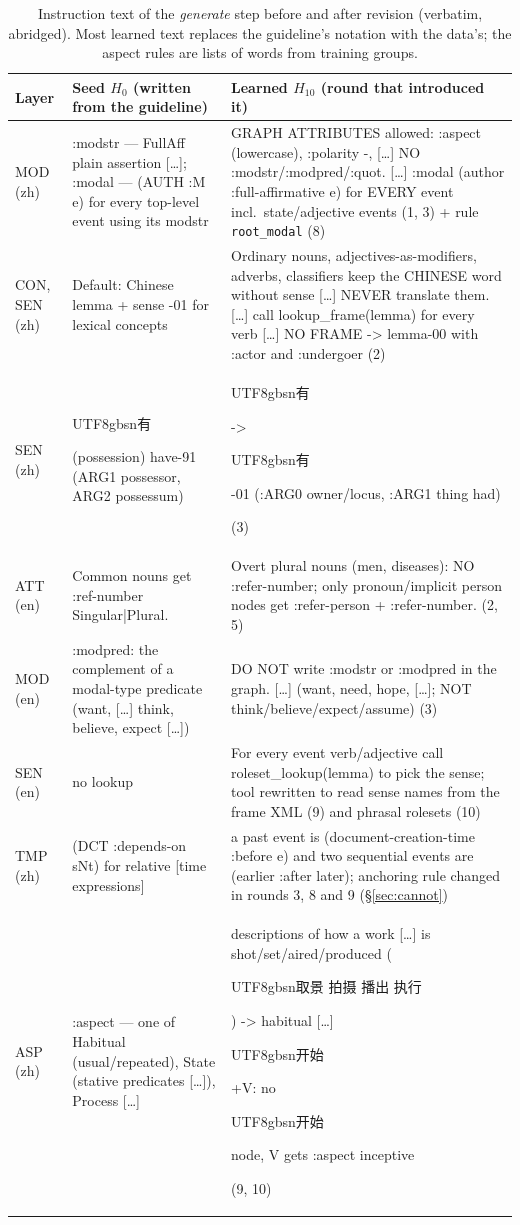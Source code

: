 \documentclass[11pt]{article}
\newcommand{\zh}[1]{\begin{CJK}{UTF8}{gbsn}#1\end{CJK}}
\newcommand{\ex}[1]{{\ttfamily\scriptsize #1}}
\begin{document}
\begin{table}[t]
\centering\scriptsize
\setlength{\tabcolsep}{4pt}
\begin{tabular}{@{}p{}p{}p{}@{}}
\toprule
Layer & Seed $H_0$ (written from the guideline) & Learned $H_{10}$ (round that introduced it) \\
\midrule
MOD (zh) & \ex{:modstr --- FullAff plain assertion [\ldots]; :modal --- (AUTH :M e) for every top-level event using its modstr} & \ex{GRAPH ATTRIBUTES allowed: :aspect (lowercase), :polarity -, [\ldots] NO :modstr/:modpred/:quot. [\ldots] :modal (author :full-affirmative e) for EVERY event incl.\ state/adjective events} (1, 3) + rule \texttt{root\_modal} (8) \\
CON, SEN (zh) & \ex{Default: Chinese lemma + sense -01 for lexical concepts} & \ex{Ordinary nouns, adjectives-as-modifiers, adverbs, classifiers keep the CHINESE word without sense [\ldots] NEVER translate them. [\ldots] call lookup\_frame(lemma) for every verb [\ldots] NO FRAME -> lemma-00 with :actor and :undergoer} (2) \\
SEN (zh) & \ex{\zh{有} (possession) have-91 (ARG1 possessor, ARG2 possessum)} & \ex{\zh{有} -> \zh{有}-01 (:ARG0 owner/locus, :ARG1 thing had)} (3) \\
ATT (en) & \ex{Common nouns get :ref-number Singular|Plural.} & \ex{Overt plural nouns (men, diseases): NO :refer-number; only pronoun/implicit person nodes get :refer-person + :refer-number.} (2, 5) \\
MOD (en) & \ex{:modpred: the complement of a modal-type predicate (want, [\ldots] think, believe, expect [\ldots])} & \ex{DO NOT write :modstr or :modpred in the graph. [\ldots] (want, need, hope, [\ldots]; NOT think/believe/expect/assume)} (3) \\
SEN (en) & no lookup & \ex{For every event verb/adjective call roleset\_lookup(lemma) to pick the sense}; tool rewritten to read sense names from the frame XML (9) and phrasal rolesets (10) \\
TMP (zh) & \ex{(DCT :depends-on sNt) for relative [time expressions]} & \ex{a past event is (document-creation-time :before e) and two sequential events are (earlier :after later)}; anchoring rule changed in rounds 3, 8 and 9 (\S\ref{sec:cannot}) \\
ASP (zh) & \ex{:aspect --- one of Habitual (usual/repeated), State (stative predicates [\ldots]), Process [\ldots]} & \ex{descriptions of how a work [\ldots] is shot/set/aired/produced (\zh{取景 拍摄 播出 执行}) -> habitual [\ldots] \zh{开始}+V: no \zh{开始} node, V gets :aspect inceptive} (9, 10) \\
\bottomrule
\end{tabular}
\caption{Instruction text of the \emph{generate} step before and after revision (verbatim, abridged). Most learned text replaces the guideline's notation with the data's; the aspect rules are lists of words from training groups.}
\label{tab:beforeafter}
\end{table}
\end{document}
